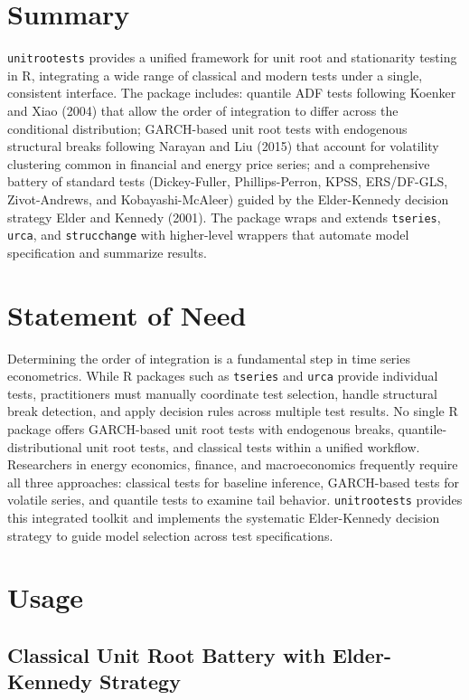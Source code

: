 \section{Summary}\label{summary}

\texttt{unitrootests} provides a unified framework for unit root and
stationarity testing in R, integrating a wide range of classical and
modern tests under a single, consistent interface. The package includes:
quantile ADF tests following Koenker and Xiao (2004) that allow the
order of integration to differ across the conditional distribution;
GARCH-based unit root tests with endogenous structural breaks following
Narayan and Liu (2015) that account for volatility clustering common in
financial and energy price series; and a comprehensive battery of
standard tests (Dickey-Fuller, Phillips-Perron, KPSS, ERS/DF-GLS,
Zivot-Andrews, and Kobayashi-McAleer) guided by the Elder-Kennedy
decision strategy Elder and Kennedy (2001). The package wraps and
extends \texttt{tseries}, \texttt{urca}, and \texttt{strucchange} with
higher-level wrappers that automate model specification and summarize
results.

\section{Statement of Need}\label{statement-of-need}

Determining the order of integration is a fundamental step in time
series econometrics. While R packages such as \texttt{tseries} and
\texttt{urca} provide individual tests, practitioners must manually
coordinate test selection, handle structural break detection, and apply
decision rules across multiple test results. No single R package offers
GARCH-based unit root tests with endogenous breaks,
quantile-distributional unit root tests, and classical tests within a
unified workflow. Researchers in energy economics, finance, and
macroeconomics frequently require all three approaches: classical tests
for baseline inference, GARCH-based tests for volatile series, and
quantile tests to examine tail behavior. \texttt{unitrootests} provides
this integrated toolkit and implements the systematic Elder-Kennedy
decision strategy to guide model selection across test specifications.

\section{Usage}\label{usage}

\subsection{Classical Unit Root Battery with Elder-Kennedy
Strategy}\label{classical-unit-root-battery-with-elder-kennedy-strategy}

